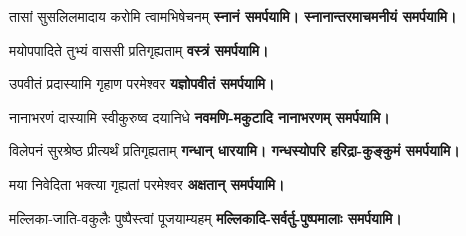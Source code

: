 \begin{center}
{तासां सुसलिलमादाय करोमि त्वामभिषेचनम्}
\nobreak%
\textbf{\devAya{} स्नानं समर्पयामि। स्नानान्तरमाचमनीयं समर्पयामि।}

{मयोपपादिते तुभ्यं वाससी प्रतिगृह्यताम्}
\nobreak%
\textbf{\devAya{} वस्त्रं समर्पयामि।}

{उपवीतं प्रदास्यामि गृहाण परमेश्वर}
\nobreak%
\textbf{\devAya{} यज्ञोपवीतं समर्पयामि।}

{नानाभरणं दास्यामि स्वीकुरुष्व दयानिधे}
\nobreak%
\textbf{\devAya{} नवमणि-मकुटादि नानाभरणम् समर्पयामि।}

{विलेपनं सुरश्रेष्ठ प्रीत्यर्थं प्रतिगृह्यताम्}
\nobreak%
\textbf{\devAya{} गन्धान् धारयामि। गन्धस्योपरि हरिद्रा-कुङ्कुमं समर्पयामि।}


{मया निवेदिता भक्त्या गृह्यतां परमेश्वर}
\nobreak%
\textbf{\devAya{} अक्षतान् समर्पयामि।}

{मल्लिका-जाति-वकुलैः पुष्पैस्त्वां पूजयाम्यहम्}
\nobreak%
\textbf{\devAya{} मल्लिकादि-सर्वर्तु-पुष्पमालाः समर्पयामि।}



\end{center}
